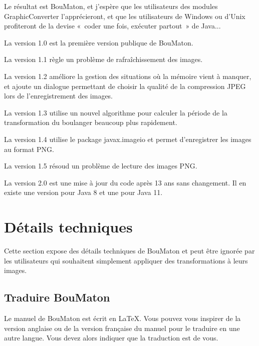 \documentclass[a4paper]{article}
\newcommand{\BouMaton}{\textsf{BouMaton}\xspace}
\newcommand{\filename}[1]{\textsf{#1}}
\begin{document}
  Le résultat est \BouMaton, et j'espère que les utilisateurs des 
  modules GraphicConverter l'apprécieront, et que les utilisateurs de 
  Windows ou d'Unix profiteront de la devise «~coder une fois, exécuter 
  partout~» de Java...
  
  \medskip
  
  \noindent La version 1.0 est la première version publique de \BouMaton.
  \par\smallskip
  \noindent La version 1.1 règle un problème de rafraîchissement des images.
  \par\smallskip
  \noindent La version 1.2 améliore la gestion des situations où la 
  mémoire vient à manquer, et ajoute un dialogue permettant de choisir 
  la qualité de la compression JPEG lors de l'enregistrement des images.
  \par\smallskip
  \noindent La version 1.3 utilise un nouvel algorithme pour calculer 
  la période de la transformation du boulanger beaucoup plus rapidement.
  \par\smallskip
  \noindent La version 1.4 utilise le package 
  \filename{javax.imageio} et permet d'enregistrer les images au 
  format PNG.
  \par\smallskip
  \noindent La version 1.5 résoud un problème de lecture des images PNG.
  \par\smallskip
  \noindent La version 2.0 est une mise à jour du code après 13 ans sans changement. 
  Il en existe une version pour Java 8 et une pour Java 11.
  
  \section{Détails techniques\label{sec:tech-details}}
  Cette section expose des détails techniques de \BouMaton et peut 
  être ignorée par les utilisateurs qui souhaitent simplement appliquer 
  des transformations à leurs images.
  
  \subsection{Traduire \BouMaton}
  Le manuel de \BouMaton est écrit en \LaTeX. Vous pouvez vous inspirer 
  de la version anglaise ou de la version française du manuel pour le 
  traduire en une autre langue. Vous devez alors indiquer que la 
  traduction est de vous.
\end{document}
